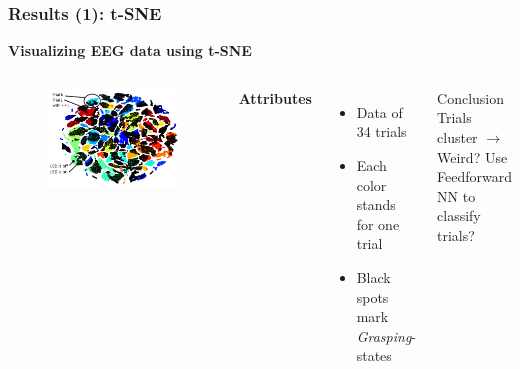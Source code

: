 \documentclass{beamer}
\begin{document}
\begin{frame}
	\frametitle{Results (1): t-SNE}
	\textbf{Visualizing EEG data using t-SNE}
	\begin{columns}
		\begin{figure}[ht]
			\centering
			\includegraphics[width=1.0\textwidth, trim={0cm 0cm 0cm 0cm},clip]{images/eeg_tsne.png}
		\end{figure}
		
		\textbf{Attributes}
		\begin{itemize}
			\item Data of 34 trials
			\item Each color stands for one trial
			\item Black spots mark \emph{Grasping}-states
		\end{itemize}
		\begin{block}{Conclusion}
			Trials cluster $\rightarrow$ Weird? Use Feedforward NN to classify trials?
		\end{block}		
	\end{columns}
\end{frame}
\end{document}
